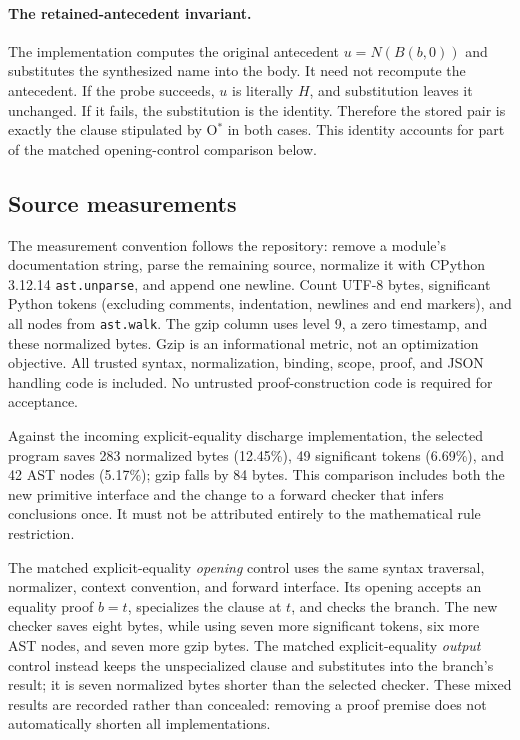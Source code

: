 \paragraph{The retained-antecedent invariant.}
The implementation computes the original antecedent $u=N(B(b,0))$ and
substitutes the synthesized name into the body. It need not recompute
the antecedent. If the probe succeeds, $u$ is literally $H$, and
substitution leaves it unchanged. If it fails, the substitution is the
identity. Therefore the stored pair is exactly the clause stipulated
by O$^*$ in both cases. This identity accounts for part of the matched
opening-control comparison below.

\subsection{Source measurements}
The measurement convention follows the repository: remove a module's
documentation string, parse the remaining source, normalize it with
CPython 3.12.14 \texttt{ast.unparse}, and append one newline. Count UTF-8
bytes, significant Python tokens (excluding comments, indentation,
newlines and end markers), and all nodes from \texttt{ast.walk}.
The gzip column uses level 9, a zero timestamp, and these normalized
bytes. Gzip is an informational metric, not an optimization objective.
All trusted syntax, normalization, binding, scope, proof, and JSON
handling code is included. No untrusted proof-construction code is
required for acceptance.



Against the incoming explicit-equality discharge implementation, the
selected program saves 283 normalized bytes (12.45\%), 49 significant
tokens (6.69\%), and 42 AST nodes (5.17\%); gzip falls by 84 bytes.
This comparison includes both the new primitive interface and the
change to a forward checker that infers conclusions once. It must not
be attributed entirely to the mathematical rule restriction.

The matched explicit-equality \emph{opening} control uses the same
syntax traversal, normalizer, context convention, and forward interface.
Its opening accepts an equality proof $b=t$, specializes the clause at
$t$, and checks the branch. The new checker saves eight bytes, while
using seven more significant tokens, six more AST nodes, and seven more
gzip bytes. The matched explicit-equality \emph{output} control instead
keeps the unspecialized clause and substitutes into the branch's result;
it is seven normalized bytes shorter than the selected checker.
These mixed results are recorded rather than concealed: removing a
proof premise does not automatically shorten all implementations.

